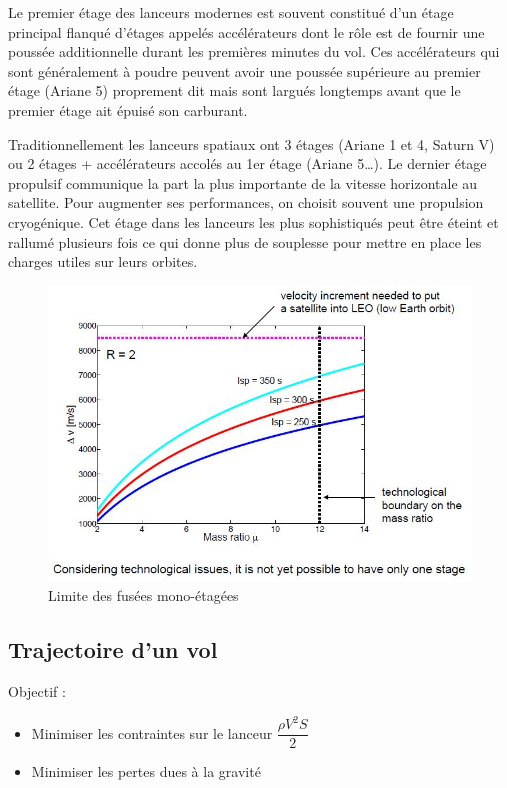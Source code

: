 \documentclass{report}
\begin{document}
Le premier étage des lanceurs modernes est souvent constitué d'un étage principal flanqué d'étages appelés accélérateurs dont le rôle est de fournir une poussée additionnelle durant les premières minutes du vol. Ces accélérateurs qui sont généralement à poudre peuvent avoir une poussée supérieure au premier étage (Ariane 5) proprement dit mais sont largués longtemps avant que le premier étage ait épuisé son carburant.

Traditionnellement les lanceurs spatiaux ont 3 étages (Ariane 1 et 4, Saturn V) ou 2 étages + accélérateurs accolés au 1er étage (Ariane 5…). Le dernier étage propulsif communique la part la plus importante de la vitesse horizontale au satellite. Pour augmenter ses performances, on choisit souvent une propulsion cryogénique. Cet étage dans les lanceurs les plus sophistiqués peut être éteint et rallumé plusieurs fois ce qui donne plus de souplesse pour mettre en place les charges utiles sur leurs orbites.

\begin{figure}[h!]
    \centering
    \includegraphics[scale=0.7]{52.JPG}
    \caption{Limite des fusées mono-étagées}
    \label{52}
\end{figure}


\subsection{Trajectoire d'un vol}

Objectif :
\begin{itemize}
    \item Minimiser les contraintes sur le lanceur $\dfrac{\rho V^2 S}{2}$
    \item Minimiser les pertes dues à la gravité
\end{itemize}
\end{document}
